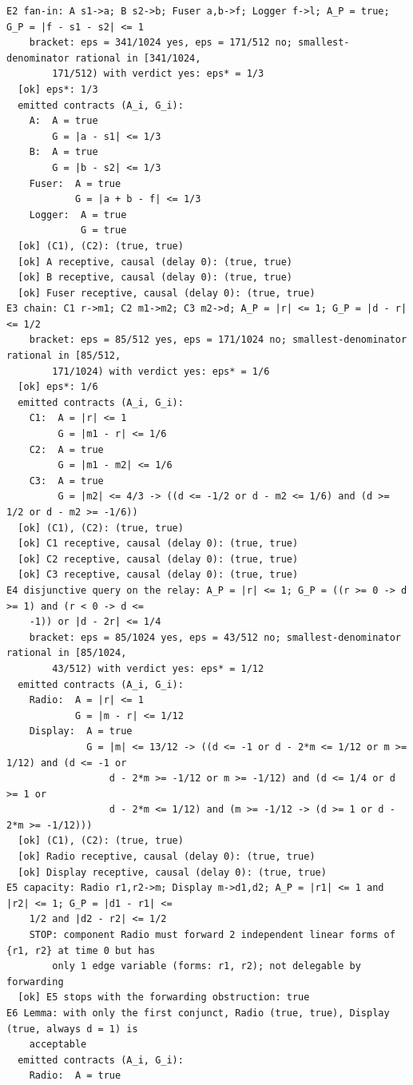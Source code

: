 \documentclass[11pt]{article}
\theoremstyle{definition}
\theoremstyle{remark}
\begin{document}
{\begin{verbatim}
E2 fan-in: A s1->a; B s2->b; Fuser a,b->f; Logger f->l; A_P = true; G_P = |f - s1 - s2| <= 1
    bracket: eps = 341/1024 yes, eps = 171/512 no; smallest-denominator rational in [341/1024,
        171/512) with verdict yes: eps* = 1/3
  [ok] eps*: 1/3
  emitted contracts (A_i, G_i):
    A:  A = true
        G = |a - s1| <= 1/3
    B:  A = true
        G = |b - s2| <= 1/3
    Fuser:  A = true
            G = |a + b - f| <= 1/3
    Logger:  A = true
             G = true
  [ok] (C1), (C2): (true, true)
  [ok] A receptive, causal (delay 0): (true, true)
  [ok] B receptive, causal (delay 0): (true, true)
  [ok] Fuser receptive, causal (delay 0): (true, true)
E3 chain: C1 r->m1; C2 m1->m2; C3 m2->d; A_P = |r| <= 1; G_P = |d - r| <= 1/2
    bracket: eps = 85/512 yes, eps = 171/1024 no; smallest-denominator rational in [85/512,
        171/1024) with verdict yes: eps* = 1/6
  [ok] eps*: 1/6
  emitted contracts (A_i, G_i):
    C1:  A = |r| <= 1
         G = |m1 - r| <= 1/6
    C2:  A = true
         G = |m1 - m2| <= 1/6
    C3:  A = true
         G = |m2| <= 4/3 -> ((d <= -1/2 or d - m2 <= 1/6) and (d >= 1/2 or d - m2 >= -1/6))
  [ok] (C1), (C2): (true, true)
  [ok] C1 receptive, causal (delay 0): (true, true)
  [ok] C2 receptive, causal (delay 0): (true, true)
  [ok] C3 receptive, causal (delay 0): (true, true)
E4 disjunctive query on the relay: A_P = |r| <= 1; G_P = ((r >= 0 -> d >= 1) and (r < 0 -> d <=
    -1)) or |d - 2r| <= 1/4
    bracket: eps = 85/1024 yes, eps = 43/512 no; smallest-denominator rational in [85/1024,
        43/512) with verdict yes: eps* = 1/12
  emitted contracts (A_i, G_i):
    Radio:  A = |r| <= 1
            G = |m - r| <= 1/12
    Display:  A = true
              G = |m| <= 13/12 -> ((d <= -1 or d - 2*m <= 1/12 or m >= 1/12) and (d <= -1 or
                  d - 2*m >= -1/12 or m >= -1/12) and (d <= 1/4 or d >= 1 or
                  d - 2*m <= 1/12) and (m >= -1/12 -> (d >= 1 or d - 2*m >= -1/12)))
  [ok] (C1), (C2): (true, true)
  [ok] Radio receptive, causal (delay 0): (true, true)
  [ok] Display receptive, causal (delay 0): (true, true)
E5 capacity: Radio r1,r2->m; Display m->d1,d2; A_P = |r1| <= 1 and |r2| <= 1; G_P = |d1 - r1| <=
    1/2 and |d2 - r2| <= 1/2
    STOP: component Radio must forward 2 independent linear forms of {r1, r2} at time 0 but has
        only 1 edge variable (forms: r1, r2); not delegable by forwarding
  [ok] E5 stops with the forwarding obstruction: true
E6 Lemma: with only the first conjunct, Radio (true, true), Display (true, always d = 1) is
    acceptable
  emitted contracts (A_i, G_i):
    Radio:  A = true

\end{verbatim}}
\end{document}
